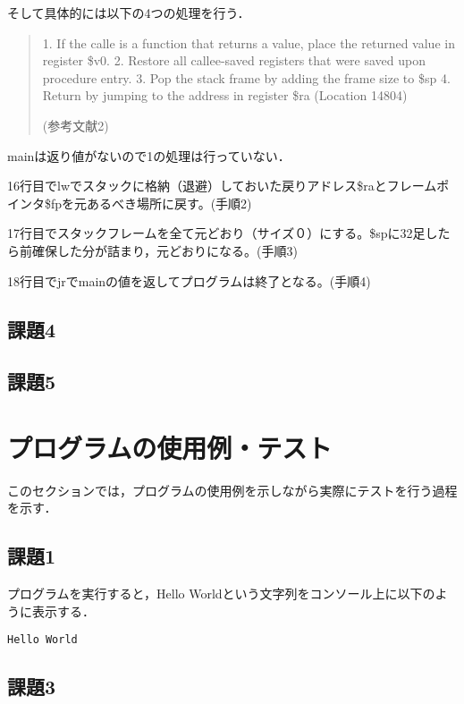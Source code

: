 \documentclass[a4j]{jarticle}
\begin{document}
そして具体的には以下の4つの処理を行う．

\begin{quote}
1. If the calle is a function that returns a value, place the returned value in register \$v0.
2. Restore all callee-saved registers that were saved upon procedure entry.
3. Pop the stack frame by adding the frame size to \$sp
4. Return by jumping to the address in register \$ra
(Location 14804)

(参考文献2)
\end{quote}


mainは返り値がないので1の処理は行っていない．

16行目でlwでスタックに格納（退避）しておいた戻りアドレス\$raとフレームポインタ\$fpを元あるべき場所に戻す。(手順2)

17行目でスタックフレームを全て元どおり（サイズ０）にする。\$spに32足したら前確保した分が詰まり，元どおりになる。(手順3)

18行目でjrでmainの値を返してプログラムは終了となる。(手順4)


\subsection{課題4}


\subsection{課題5}



%
%

\section{プログラムの使用例・テスト}

このセクションでは，プログラムの使用例を示しながら実際にテストを行う過程を示す．

\subsection{課題1}

プログラムを実行すると，Hello Worldという文字列をコンソール上に以下のように表示する．

{\baselineskip 3mm
\begin{verbatim}
Hello World
\end{verbatim}
}


\subsection{課題3}
\end{document}
